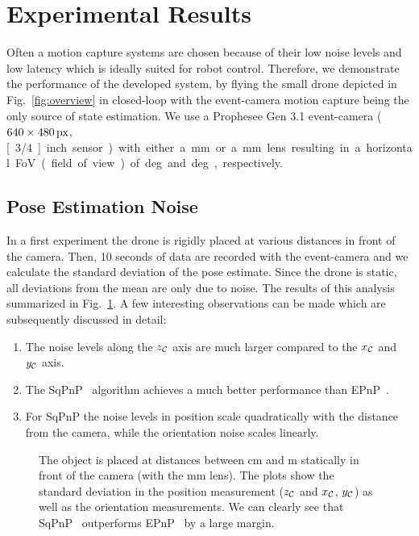 \section{Experimental Results}
\label{sec:experimental_results}
Often a motion capture systems are chosen because of their low noise levels and low latency which is ideally suited for robot control. Therefore, we demonstrate the performance of the developed system, by flying the small drone depicted in Fig.~\ref{fig:overview} in closed-loop with the event-camera motion capture being the only source of state estimation. We use a Prophesee Gen 3.1 event-camera ($\unit[640\times 480]{px}$, \unit[3/4]{inch} sensor) with either a \unit[25]{mm} or a \unit[50]{mm} lens resulting in a horizontal FoV (field of view) of \unit[22]{deg} and \unit[11]{deg}, respectively.

\subsection{Pose Estimation Noise}
In a first experiment the drone is rigidly placed at various distances in front of the camera. Then, 10 seconds of data are recorded with the event-camera and we calculate the standard deviation of the pose estimate. Since the drone is static, all deviations from the mean are only due to noise. The results of this analysis summarized in Fig.~\ref{fig:pose_noise}. A few interesting observations can be made which are subsequently discussed in detail:
\begin{enumerate}
    \item The noise levels along the $z_{\mathcal{C}}$ axis are much larger compared to the $x_{\mathcal{C}}$ and $y_{\mathcal{C}}$ axis.
    \item The SqPnP~\cite{terzakis2020sqpnp} algorithm achieves a much better performance than EPnP~\cite{lepetit2009epnp}.
    \item For SqPnP the noise levels in position scale quadratically with the distance from the camera, while the orientation noise scales linearly.
\end{enumerate}

\begin{figure}
    \centering
    
    \caption{The object is placed at distances between \unit[70]{cm} and \unit[5]{m} statically in front of the camera (with the \unit[25]{mm} lens). The plots show the standard deviation in the position measurement ($z_{\mathcal{C}}$ and $x_{\mathcal{C}}$, $y_{\mathcal{C}}$) as well as the orientation measurements. We can clearly see that SqPnP~\cite{terzakis2020sqpnp} outperforms EPnP~\cite{lepetit2009epnp} by a large margin.}
    \label{fig:pose_noise}
\end{figure}

